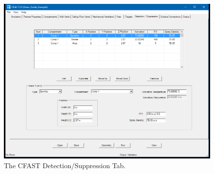 \begin{figure}[h!]
\begin{center}
\includegraphics[width=6.5in]{FIGURES/Detector_Tab}
\caption[The CFAST Detection/Suppression Tab]{The CFAST Detection/Suppression Tab.}
\end{center}
\end{figure}

